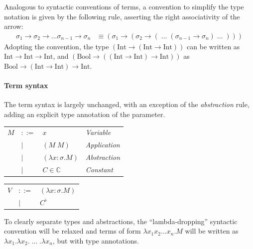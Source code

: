\documentclass[table, a4paper, 10pt]{article}
\begin{document}
Analogous to syntactic conventions of terms, a convention to 
simplify the type notation is given by the following rule, asserting the right associativity of the arrow:
\begin{align*}
\sigma_1 \to \sigma_2 \to ... \sigma_{n-1} \to \sigma_n &\equiv (\sigma_1 \to (\sigma_2 \to (\;...\;(\sigma_{n-1} \to \sigma_n)\;...\;))) 
\end{align*}
Adopting the convention, the type {\small$(\mathrm{Int} \to (\mathrm{Int} \to \mathrm{Int}))$} can be written as
{\small$\mathrm{Int} \to \mathrm{Int} \to \mathrm{Int}$},
and {\small$(\mathrm{Bool} \to ((\mathrm{Int} \to \mathrm{Int}) \to \mathrm{Int}))$} as
{\small$\mathrm{Bool} \to (\mathrm{Int} \to \mathrm{Int}) \to \mathrm{Int}$}.

\paragraph{Term syntax}
The term syntax is largely unchanged, with an exception of
the \textit{abstraction} rule, adding an explicit type annotation of the parameter.

\begin{tabular}{llll}
$M$ &$::=$             &$x$                 & {\small\hspace{0.2cm}\textit{Variable}}\\
    &\hspace{0.1cm}$|$ &$(M\;M)$            & {\small\hspace{0.2cm}\textit{Application}}\\
    &\hspace{0.1cm}$|$ &$(\lambda x{:}\sigma.M)$     & {\small\hspace{0.2cm}\textit{Abstraction}}\\
    &\hspace{0.1cm}$|$ &$C \in \mathbb{C}$  & {\small\hspace{0.2cm}\textit{Constant}}\\
\end{tabular}
\begin{tabular}{lll}
\hspace{11mm}$V$ &$::=$             &$(\lambda x{:}\sigma.M)$\\
\hspace{11mm}    &\hspace{0.1cm}$|$ &$C^\flat$  
\hspace{11mm}
\end{tabular}

\noindent
To clearly separate types and abstractions, the ``lambda-dropping'' syntactic convention will be relaxed
and terms of form $\lambda x_1 x_2 ... x_n.M$ will be written as $\lambda x_1.\lambda x_2.\;...\;.\lambda x_n$,
but with type annotations.
\end{document}
